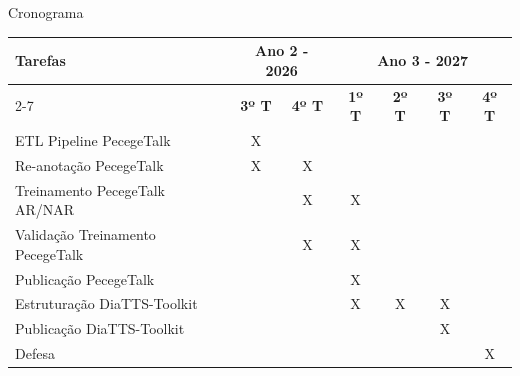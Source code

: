 \begin{frame}{Cronograma}
  \tiny
  \begin{table}[]
    \begin{tabular}{|l|cc|cccc|}
      \hline
      \multirow{2}{*}{\textbf{Tarefas}}
      & \multicolumn{2}{c|}{\textbf{Ano 2 - 2026}}                                &
      \multicolumn{4}{c|}{\textbf{Ano 3 - 2027}}
      \\ \cline{2-7}
      & \multicolumn{1}{c|}{\textbf{3º T}}  & \multicolumn{1}{c|}{\textbf{4º T}}  &
      \multicolumn{1}{c|}{\textbf{1º T}} & \multicolumn{1}{c|}{\textbf{2º T}} &
      \multicolumn{1}{c|}{\textbf{3º T}} & \textbf{4º T}           \\ \hline
      ETL Pipeline PecegeTalk
      & \multicolumn{1}{c|}{X}              & \multicolumn{1}{c|}{}               &
      \multicolumn{1}{c|}{}              & \multicolumn{1}{c|}{}              &
      \multicolumn{1}{c|}{}              & \multicolumn{1}{c|}{} \\ \hline
      Re-anotação PecegeTalk
      & \multicolumn{1}{c|}{X}              & \multicolumn{1}{c|}{X}              &
      \multicolumn{1}{c|}{}              & \multicolumn{1}{c|}{}              &
      \multicolumn{1}{c|}{}              & \multicolumn{1}{c|}{} \\ \hline
      Treinamento PecegeTalk AR/NAR
      & \multicolumn{1}{c|}{}               & \multicolumn{1}{c|}{X}              &
      \multicolumn{1}{c|}{X}             & \multicolumn{1}{c|}{}              &
      \multicolumn{1}{c|}{}              & \multicolumn{1}{c|}{} \\ \hline
      Validação Treinamento PecegeTalk
      & \multicolumn{1}{c|}{}               & \multicolumn{1}{c|}{X}              &
      \multicolumn{1}{c|}{X}             & \multicolumn{1}{c|}{}              &
      \multicolumn{1}{c|}{}              & \multicolumn{1}{c|}{} \\ \hline
      Publicação PecegeTalk
      & \multicolumn{1}{c|}{}               & \multicolumn{1}{c|}{}               &
      \multicolumn{1}{c|}{X}             & \multicolumn{1}{c|}{}              &
      \multicolumn{1}{c|}{}              & \multicolumn{1}{c|}{} \\ \hline
      Estruturação DiaTTS-Toolkit
      & \multicolumn{1}{c|}{}               & \multicolumn{1}{c|}{}               &
      \multicolumn{1}{c|}{X}             & \multicolumn{1}{c|}{X}             &
      \multicolumn{1}{c|}{X}             & \multicolumn{1}{c|}{} \\ \hline
      Publicação DiaTTS-Toolkit
      & \multicolumn{1}{c|}{}               & \multicolumn{1}{c|}{}               &
      \multicolumn{1}{c|}{}             & \multicolumn{1}{c|}{}             &
      \multicolumn{1}{c|}{X}             & \multicolumn{1}{c|}{}   \\ \hline
      Defesa
      & \multicolumn{1}{c|}{}               & \multicolumn{1}{c|}{}               &
      \multicolumn{1}{c|}{}             & \multicolumn{1}{c|}{}             &
      \multicolumn{1}{c|}{}             & \multicolumn{1}{c|}{X}   \\ \hline
    \end{tabular}
  \end{table}
\end{frame}
